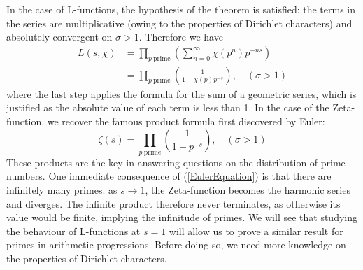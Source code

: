 In the case of L-functions, the hypothesis of the theorem is satisfied: the terms in the series are multiplicative (owing to the properties of Dirichlet characters) and absolutely convergent on $\sigma > 1$. Therefore we have
\begin{align}
    L(s, \chi) &= \prod_{p \ \mathrm{prime}} \left(\sum_{n=0}^{\infty} \chi(p^{n})p^{-ns} \right) \nonumber \\
    &= \prod_{p \ \mathrm{prime}} \left(\frac{1}{1 - \chi(p)p^{-s}} \right), \quad (\sigma > 1)
\end{align}
where the last step applies the formula for the sum of a geometric series, which is justified as the absolute value of each term is less than 1. In the case of the Zeta-function, we recover the famous product formula first discovered by Euler:
\begin{equation}
    \label{EulerEquation}
    \zeta(s) = \prod_{p \ \mathrm{prime}} \left(\frac{1}{1 - p^{-s}} \right), \quad (\sigma > 1) 
\end{equation}
These products are the key in answering questions on the distribution of prime numbers. One immediate consequence of (\ref{EulerEquation}) is that there are infinitely many primes: as $s \rightarrow 1$, the Zeta-function becomes the harmonic series and diverges. The infinite product therefore never terminates, as otherwise its value would be finite, implying the infinitude of primes. We will see that studying the behaviour of L-functions at $s=1$ will allow us to prove a similar result for primes in arithmetic progressions. Before doing so, we need more knowledge on the properties of Dirichlet characters.\\